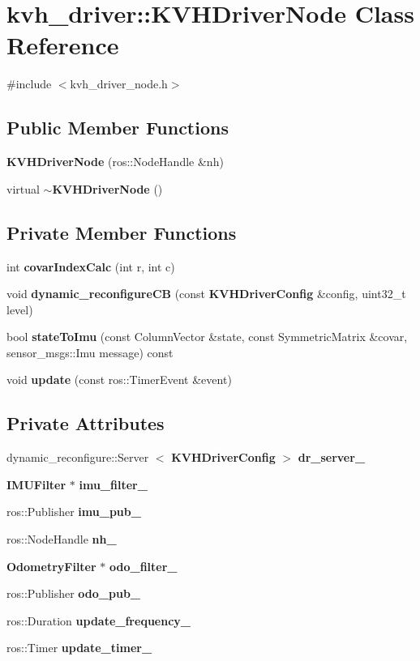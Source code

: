 \section{kvh\-\_\-driver\-:\-:\-K\-V\-H\-Driver\-Node \-Class \-Reference}
\label{classkvh__driver_1_1KVHDriverNode}


{\ttfamily \#include $<$kvh\-\_\-driver\-\_\-node.\-h$>$}

\subsection*{\-Public \-Member \-Functions}
\begin{DoxyCompactItemize}
\item 
{\bf \-K\-V\-H\-Driver\-Node} (ros\-::\-Node\-Handle \&nh)
\item 
virtual {\bf $\sim$\-K\-V\-H\-Driver\-Node} ()
\end{DoxyCompactItemize}
\subsection*{\-Private \-Member \-Functions}
\begin{DoxyCompactItemize}
\item 
int {\bf covar\-Index\-Calc} (int r, int c)
\item 
void {\bf dynamic\-\_\-reconfigure\-C\-B} (const {\bf \-K\-V\-H\-Driver\-Config} \&config, uint32\-\_\-t level)
\item 
bool {\bf state\-To\-Imu} (const \-Column\-Vector \&state, const \-Symmetric\-Matrix \&covar, sensor\-\_\-msgs\-::\-Imu message) const 
\item 
void {\bf update} (const ros\-::\-Timer\-Event \&event)
\end{DoxyCompactItemize}
\subsection*{\-Private \-Attributes}
\begin{DoxyCompactItemize}
\item 
dynamic\-\_\-reconfigure\-::\-Server\*
$<$ {\bf \-K\-V\-H\-Driver\-Config} $>$ {\bf dr\-\_\-server\-\_\-}
\item 
{\bf \-I\-M\-U\-Filter} $\ast$ {\bf imu\-\_\-filter\-\_\-}
\item 
ros\-::\-Publisher {\bf imu\-\_\-pub\-\_\-}
\item 
ros\-::\-Node\-Handle {\bf nh\-\_\-}
\item 
{\bf \-Odometry\-Filter} $\ast$ {\bf odo\-\_\-filter\-\_\-}
\item 
ros\-::\-Publisher {\bf odo\-\_\-pub\-\_\-}
\item 
ros\-::\-Duration {\bf update\-\_\-frequency\-\_\-}
\item 
ros\-::\-Timer {\bf update\-\_\-timer\-\_\-}
\end{DoxyCompactItemize}


